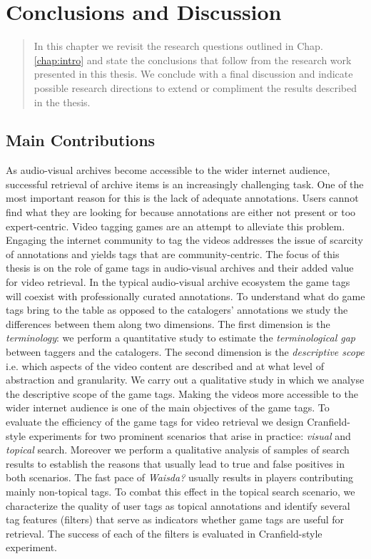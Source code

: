 \chapter{Conclusions and Discussion}\label{chap:conclusion}
\begin{quotation}
\noindent 
In this chapter we revisit the research questions outlined in Chap. \ref{chap:intro} and state the conclusions that follow from the research work presented in this thesis. We conclude with a final discussion and indicate possible research directions to extend or compliment the results described in the thesis.  
\end{quotation}

\section{Main Contributions}
As audio-visual archives become accessible to the wider internet audience, successful retrieval of archive items is an increasingly challenging task. One of the most important reason for this is the lack of adequate annotations. Users cannot find what they are looking for because annotations are either not
present or too expert-centric. Video tagging games are an attempt to alleviate this problem. Engaging the internet community to tag the videos addresses the issue of scarcity of annotations and yields tags that are community-centric. The focus of this thesis is on the role of game tags in audio-visual archives and their added value for video retrieval. In the typical audio-visual archive ecosystem the game tags will coexist with professionally curated annotations. To understand what do game tags bring to the table as opposed to the catalogers' annotations we study the differences between them along two dimensions. The first dimension is the \textit{terminology}: we perform a quantitative study to estimate the \textit{terminological gap} between taggers and the catalogers. The second dimension is the \textit{descriptive scope} i.e. which aspects of the video content are described and at what level of abstraction and granularity. We carry out a qualitative study in which we analyse the descriptive scope of the game tags. Making the videos more accessible to the wider internet audience is one of the main objectives of the game tags. To evaluate the efficiency of the game tags for video retrieval we design Cranfield-style experiments for two prominent scenarios that arise in practice: \textit{visual} and \textit{topical} search. Moreover we perform a qualitative analysis of samples of search results to establish the reasons that usually lead to true and false positives in both scenarios. The fast pace of \textit{Waisda?} usually results in players contributing mainly non-topical tags. To combat this effect in the topical search scenario, we characterize the quality of user tags as topical annotations and identify several tag features (filters) that serve as indicators whether game tags are useful for retrieval. The success of each of the filters is evaluated in Cranfield-style experiment.

